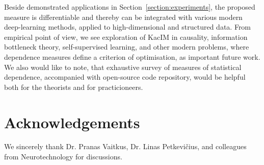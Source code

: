 \documentclass{article}
\begin{document}
Beside demonstrated applications in Section~\ref{section:experiments}, the proposed measure is differentiable and thereby can be integrated with various modern deep-learning methods, applied to high-dimensional and structured data. From empirical point of view, we see exploration of KacIM in causality, information bottleneck theory, self-supervised learning, and other modern problems, where dependence measures define a criterion of optimisation, as important future work. We also would like to note, that exhaustive survey of measures of statistical dependence, accompanied with open-source code repository, would be helpful both for the theorists and for practicioneers.

\section{Acknowledgements}

We sincerely thank Dr. Pranas Vaitkus, Dr. Linas Petkevi\v{c}ius, and colleagues from Neurotechnology for discussions.
\end{document}
